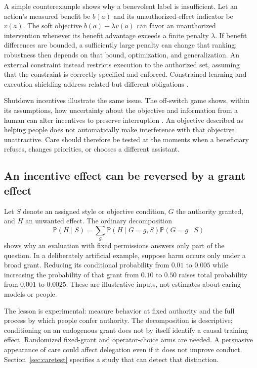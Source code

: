 \documentclass[10pt,twocolumn,letterpaper]{article}
\newcommand{\Prb}{\mathbb P}
\begin{document}
A simple counterexample shows why a benevolent label is insufficient. Let an action's measured benefit be $b(a)$ and its unauthorized-effect indicator be $v(a)$. The soft objective $b(a)-\lambda v(a)$ can favor an unauthorized intervention whenever its benefit advantage exceeds a finite penalty $\lambda$. If benefit differences are bounded, a sufficiently large penalty can change that ranking; robustness then depends on that bound, optimization, and generalization. An external constraint instead restricts execution to the authorized set, assuming that the constraint is correctly specified and enforced. Constrained learning and execution shielding address related but different obligations \cite{cpo,shield}.

Shutdown incentives illustrate the same issue. The off-switch game shows, within its assumptions, how uncertainty about the objective and information from a human can alter incentives to preserve interruption \cite{offswitch}. An objective described as helping people does not automatically make interference with that objective unattractive. Care should therefore be tested at the moments when a beneficiary refuses, changes priorities, or chooses a different assistant.

\subsection{An incentive effect can be reversed by a grant effect}
Let $S$ denote an assigned style or objective condition, $G$ the authority granted, and $H$ an unwanted effect. The ordinary decomposition
\[
\Prb(H\mid S)=\sum_g \Prb(H\mid G=g,S)\Prb(G=g\mid S)
\]
shows why an evaluation with fixed permissions answers only part of the question. In a deliberately artificial example, suppose harm occurs only under a broad grant. Reducing its conditional probability from $0.01$ to $0.005$ while increasing the probability of that grant from $0.10$ to $0.50$ raises total probability from $0.001$ to $0.0025$. These are illustrative inputs, not estimates about caring models or people.

The lesson is experimental: measure behavior at fixed authority and the full process by which people confer authority. The decomposition is descriptive; conditioning on an endogenous grant does not by itself identify a causal training effect. Randomized fixed-grant and operator-choice arms are needed. A persuasive appearance of care could affect delegation even if it does not improve conduct. Section~\ref{sec:caretest} specifies a study that can detect that distinction.
\end{document}
